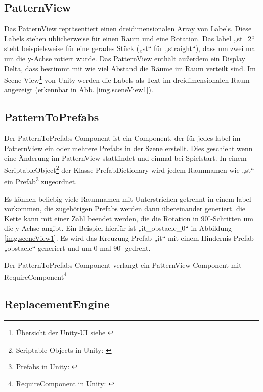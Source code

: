 \subsection{PatternView}

Das PatternView repräsentiert einen dreidimensionalen Array von Labels. Diese Labels stehen üblicherweise für einen Raum und eine Rotation. Das label „st\_2“ steht beispielsweise für eine gerades Stück („st“ für „straight“), dass um zwei mal um die y-Achse rotiert wurde. Das PatternView enthält außerdem ein Display Delta, dass bestimmt mit wie viel Abstand die Räume im Raum verteilt sind. Im Scene View\footnote{Übersicht der Unity-UI siehe \cite[Seite: LearningtheInterface]{unityManual}} von Unity werden die Labels als Text im dreidimensionalen Raum angezeigt (erkennbar in Abb. \ref{img.sceneView1}).


\subsection{PatternToPrefabs}

Der PatternToPrefabs Component ist ein Component, der für jedes label im PatternView ein oder mehrere Prefabs in der Szene erstellt. Dies geschieht wenn eine Änderung im PatternView stattfindet und einmal bei Spielstart. In einem ScriptableObject\footnote{Scriptable Objects in Unity: \cite[Seite: class-ScriptableObject]{unityManual}} der Klasse PrefabDictionary wird jedem Raumnamen wie „st“ ein Prefab\footnote{Prefabs in Unity: \cite[Seite: LearningtheInterface]{unityManual}} zugeordnet. 

Es können beliebig viele Raumnamen mit Unterstrichen getrennt in einem label vorkommen, die zugehörigen Prefabs werden dann übereinander generiert. die Kette kann mit einer Zahl beendet werden, die die Rotation in $90^\circ$-Schritten um die y-Achse angibt. Ein Beispiel hierfür ist „it\_obstacle\_0“ in Abbildung \ref{img.sceneView1}. Es wird das Kreuzung-Prefab „it“ mit einem Hindernis-Prefab „obstacle“ generiert und um 0 mal $90^\circ$ gedreht.

Der PatternToPrefabs Component verlangt ein PatternView Component mit RequireComponent\footnote{RequireComponent in Unity: \cite[Seite: RequireComponent]{unitySciptingReference}}

\subsection{ReplacementEngine}

